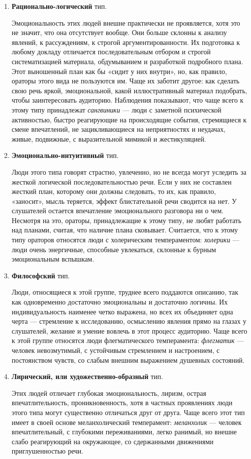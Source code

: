     \begin{enumerate} 
    \item \textbf{Рационально-логический} тип. 
    
Эмоциональность этих людей внешне практически не
 проявляется, хотя это не значит, что она отсутствует вообще. 
 Они больше склонны к анализу явлений, к рассуждениям, к строгой аргументированности. Их подготовка к любому докладу отличается последовательным отбором и строгой систематизацией материала, обдумыванием и разработкой подробного плана. 
 Этот выношенный план как бы «сидит у них внутри», но, как правило, ораторы этого вида не пользуются им. 
 Чаще их заботит другое: как сделать свою речь яркой, эмоциональной, какой иллюстративный материал подобрать, чтобы заинтересовать аудиторию. 
 Наблюдения показывают, что чаще всего к этому типу принадлежат \textit{сангвиники} — люди с заметной психической
 активностью, быстро реагирующие на происходящие события, стремящиеся к смене впечатлений, не зацикливающиеся на неприятностях и неудачах, живые, подвижные, с выразительной мимикой и жестикуляцией.
 \item \textbf{Эмоционально-интуитивный} тип. 
 
 Люди этого типа говорят страстно, увлеченно, но
 не всегда могут уследить за жесткой логической последовательностью речи. 
Если у них не составлен жесткий план, которому они должны следовать, то их, как правило, «заносит», мысль теряется, эффект блистательной речи сводится на нет. 
У слушателей остается впечатление эмоционального разговора ни о чем. 
Несмотря на это, ораторы, принадлежащие к этому типу, не любят работать над планами, считая, что наличие плана сковывает. 
Считается, что к этому типу ораторов относятся люди с холерическим темпераментом: \textit{холерики} — люди очень энергичные, способные увлекаться, склонные к бурным эмоциональным вспышкам.
\item \textbf{Философский} тип. 

Люди, относящиеся к этой группе, труднее всего поддаются описанию, так как одновременно достаточно эмоциональны и достаточно логичны. 
Их индивидуальность наименее четко выражена, но всех их объединяет одна черта — стремление к исследованию, осмыслению явления прямо на глазах у слушателей, желание и умение вовлечь в этот процесс аудиторию. 
Чаще всего к этой группе относятся люди флегматического темперамента: \textit{флегматик} — человек невозмутимый, с
устойчивым стремлением и настроением, с постоянством чувств, со слабым внешним выражением душевных состояний.
\item \textbf{Лирический, или художественно-образный} тип. 

Этих людей отличает глубокая эмоциональность, лиризм, острая впечатлительность, проникновенность, хотя в частных проявлениях люди этого типа могут существенно отличаться друг от друга.
Чаще всего этот тип имеет в своей основе меланхолический темперамент: \textit{меланхолик} — человек впечатлительный, с глубокими переживаниями, легко ранимый, но внешне слабо реагирующий на окружающее, со сдержанными движениями приглушенностью речи.
    \end{enumerate}
